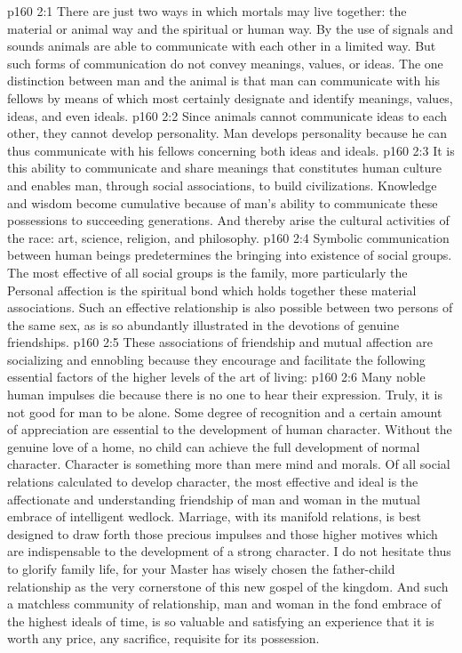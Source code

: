 \vs p160 2:1 There are just two ways in which mortals may live together: the material or animal way and the spiritual or human way. By the use of signals and sounds animals are able to communicate with each other in a limited way. But such forms of communication do not convey meanings, values, or ideas. The one distinction between man and the animal is that man can communicate with his fellows by means of  which most certainly designate and identify meanings, values, ideas, and even ideals.
\vs p160 2:2 Since animals cannot communicate ideas to each other, they cannot develop personality. Man develops personality because he can thus communicate with his fellows concerning both ideas and ideals.
\vs p160 2:3 It is this ability to communicate and share meanings that constitutes human culture and enables man, through social associations, to build civilizations. Knowledge and wisdom become cumulative because of man’s ability to communicate these possessions to succeeding generations. And thereby arise the cultural activities of the race: art, science, religion, and philosophy.
\vs p160 2:4 Symbolic communication between human beings predetermines the bringing into existence of social groups. The most effective of all social groups is the family, more particularly the  Personal affection is the spiritual bond which holds together these material associations. Such an effective relationship is also possible between two persons of the same sex, as is so abundantly illustrated in the devotions of genuine friendships.
\vs p160 2:5 These associations of friendship and mutual affection are socializing and ennobling because they encourage and facilitate the following essential factors of the higher levels of the art of living:
\pc \vs p160 2:6 \bibnobreakspace {} Many noble human impulses die because there is no one to hear their expression. Truly, it is not good for man to be alone. Some degree of recognition and a certain amount of appreciation are essential to the development of human character. Without the genuine love of a home, no child can achieve the full development of normal character. Character is something more than mere mind and morals. Of all social relations calculated to develop character, the most effective and ideal is the affectionate and understanding friendship of man and woman in the mutual embrace of intelligent wedlock. Marriage, with its manifold relations, is best designed to draw forth those precious impulses and those higher motives which are indispensable to the development of a strong character. I do not hesitate thus to glorify family life, for your Master has wisely chosen the father\hyp{}child relationship as the very cornerstone of this new gospel of the kingdom. And such a matchless community of relationship, man and woman in the fond embrace of the highest ideals of time, is so valuable and satisfying an experience that it is worth any price, any sacrifice, requisite for its possession.
